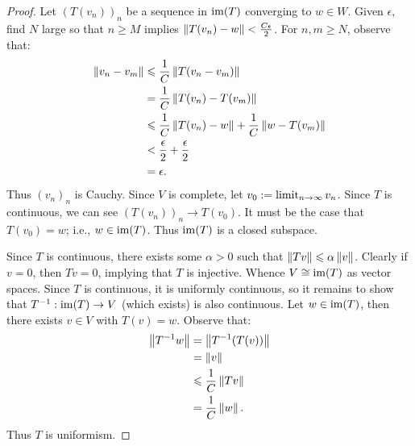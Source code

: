 \documentclass[11pt,twoside,openany]{memoir}
\begin{document}
        \begin{proof}
            Let $(T(v_n))_n$ be a sequence in $\operatorname{im}(T)$ converging to $w \in W$. Given $\epsilon$, find $N$ large so that $n \geq M$ implies $\left\lVert T(v_n)-w \right\rVert < \frac{C\epsilon}{2}$. For $n,m \geq N$, observe that:
                \begin{equation*}
                \begin{split}
                    \left\lVert v_n - v_m \right\rVert
                    & \leqslant \frac{1}{C}\left\lVert T(v_n - v_m) \right\rVert \\
                    & = \frac{1}{C}\left\lVert T(v_n) - T(v_m) \right\rVert \\
                    & \leqslant \frac{1}{C}\left\lVert T(v_n) - w \right\rVert + \frac{1}{C}\left\lVert w - T(v_m) \right\rVert \\
                    & < \frac{\epsilon}{2} + \frac{\epsilon}{2} \\
                    & = \epsilon.
                \end{split}
                \end{equation*}
            Thus $(v_n)_n$ is Cauchy. Since $V$ is complete, let $v_0 := \operatorname*{limit}_{n \rightarrow \infty}v_n$. Since $T$ is continuous, we can see $(T(v_n))_n \rightarrow T(v_0)$. It must be the case that $T(v_0) = w$; i.e., $w \in \operatorname{im}(T)$. Thus $\operatorname{im}(T)$ is a closed subspace.

            Since $T$ is continuous, there exists some $\alpha > 0$ such that $\left\lVert Tv \right\rVert \leqslant \alpha \left\lVert  v \right\rVert$. Clearly if $v = 0$, then $Tv = 0$, implying that $T$ is injective. Whence $V \cong \operatorname{im}(T)$ as vector spaces. Since $T$ is continuous, it is uniformly continuous, so it remains to show that $T^{-1}:\operatorname{im}(T) \rightarrow V$ (which exists) is also continuous. Let $w \in \operatorname{im}(T)$, then there exists $v \in V$ with $T(v) = w$. Observe that:
                \begin{equation*}
                \begin{split}
                    \left\lVert T^{-1} w \right\rVert
                    & = \left\lVert T^{-1}(T(v)) \right\rVert \\
                    & = \left\lVert v \right\rVert \\
                    & \leqslant \frac{1}{C}\left\lVert Tv \right\rVert \\
                    & = \frac{1}{C}\left\lVert w \right\rVert.
                \end{split}
                \end{equation*}
            Thus $T$ is uniformism.
        \end{proof}
\end{document}
